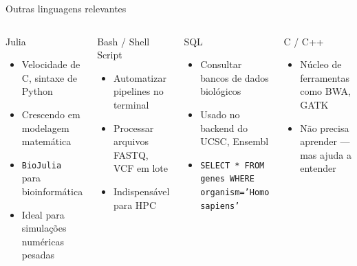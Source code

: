 \begin{frame}[fragile, shrink=15]{Outras linguagens relevantes}
\begin{columns}
\begin{block}{Julia}
\begin{itemize}
    \item Velocidade de C, sintaxe de Python
    \item Crescendo em modelagem matemática
    \item \texttt{BioJulia} para bioinformática
    \item Ideal para simulações numéricas pesadas
\end{itemize}
\end{block}

\vspace{0.4cm}
\begin{block}{Bash / Shell Script}
\begin{itemize}
    \item Automatizar pipelines no terminal
    \item Processar arquivos FASTQ, VCF em lote
    \item Indispensável para HPC
\end{itemize}
\end{block}

\begin{block}{SQL}
\begin{itemize}
    \item Consultar bancos de dados biológicos
    \item Usado no backend do UCSC, Ensembl
    \item \texttt{SELECT * FROM genes WHERE organism='Homo sapiens'}
\end{itemize}
\end{block}

\vspace{0.4cm}
\begin{block}{C / C++}
\begin{itemize}
    \item Núcleo de ferramentas como BWA, GATK
    \item Não precisa aprender — mas ajuda a entender
\end{itemize}
\end{block}
\end{columns}
\end{frame}

